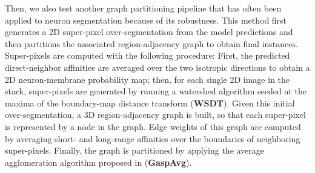 Then, we also test another graph partitioning pipeline that has often been applied to neuron segmentation because of its robustness. This method first generates a 2D super-pixel over-segmentation from the model predictions and then partitions the associated region-adjacency graph to obtain final instances. Super-pixels are computed with the following procedure: First, the predicted direct-neighbor affinities are averaged over the two isotropic directions to obtain a 2D neuron-membrane probability map; then, for each single 2D image in the stack, super-pixels are generated by running a watershed algorithm seeded at the maxima of the boundary-map distance transform (\textbf{WSDT}). Given this initial over-segmentation, a 3D region-adjacency graph is built, so that each super-pixel is represented by a node in the graph. Edge weights of this graph are computed by averaging short- and long-range affinities over the boundaries of neighboring super-pixels. 
Finally, the graph is partitioned by applying the average agglomeration algorithm proposed in \cite{bailoni2019generalized} (\textbf{GaspAvg}).


  





